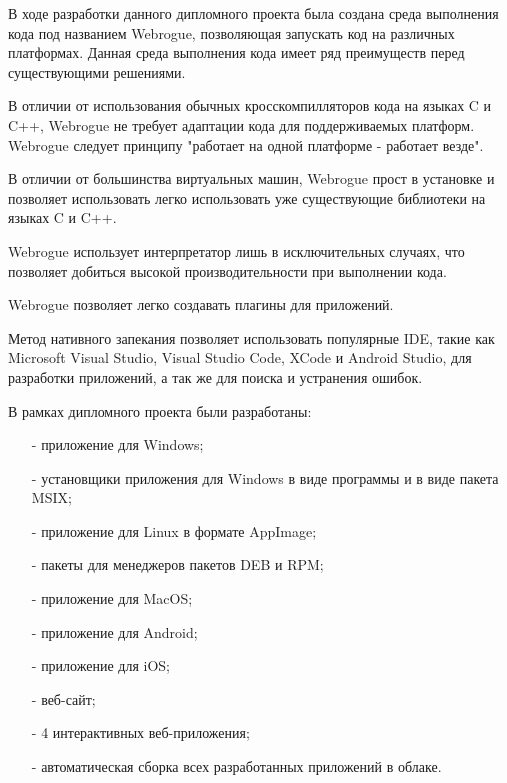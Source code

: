 В ходе разработки данного дипломного проекта была создана среда выполнения кода под названием Webrogue, позволяющая запускать код на различных платформах.
Данная среда выполнения кода имеет ряд преимуществ перед существующими решениями.

В отличии от использования обычных кросскомпилляторов кода на языках C и C++, Webrogue не требует адаптации кода для поддерживаемых платформ. 
Webrogue следует принципу "работает на одной платформе - работает везде".

В отличии от большинства виртуальных машин, Webrogue прост в установке и позволяет использовать легко использовать уже существующие библиотеки на языках C и C++.

Webrogue использует интерпретатор лишь в исключительных случаях, что позволяет добиться высокой производительности при выполнении кода.

Webrogue позволяет легко создавать плагины для приложений.

Метод нативного запекания позволяет использовать популярные IDE, такие как Microsoft Visual Studio, Visual Studio Code, XCode и Android Studio, для разработки приложений, а так же для поиска и устранения ошибок.

В рамках дипломного проекта были разработаны:
\begin{itemize}
    \item[-] приложение для Windows;
    \item[-] установщики приложения для Windows в виде программы и в виде пакета MSIX;
    \item[-] приложение для Linux в формате AppImage;
    \item[-] пакеты для менеджеров пакетов DEB и RPM;
    \item[-] приложение для MacOS;
    \item[-] приложение для Android;
    \item[-] приложение для iOS;
    \item[-] веб-сайт;
    \item[-] 4 интерактивных веб-приложения;
    \item[-] автоматическая сборка всех разработанных приложений в облаке.
\end{itemize}

